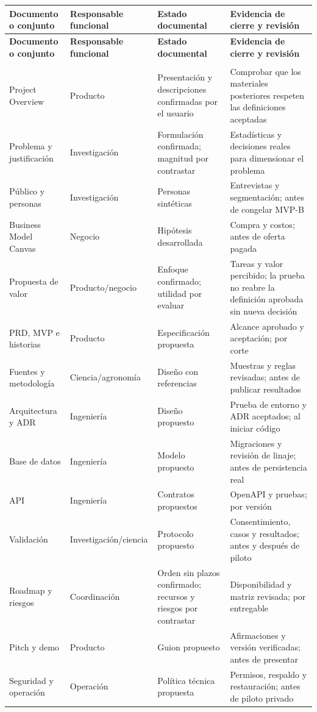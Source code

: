 \documentclass[10pt,a4paper]{article}
\begin{document}
\begingroup\small
\begin{longtable}{>{\raggedright\arraybackslash}p{3.115cm}>{\raggedright\arraybackslash}p{3.582cm}>{\raggedright\arraybackslash}p{4.517cm}>{\raggedright\arraybackslash}p{4.361cm}}
\toprule
\textbf{Documento o conjunto} & \textbf{Responsable funcional} & \textbf{Estado documental} & \textbf{Evidencia de cierre y revisión} \\
\midrule\endfirsthead
\toprule
\textbf{Documento o conjunto} & \textbf{Responsable funcional} & \textbf{Estado documental} & \textbf{Evidencia de cierre y revisión} \\
\midrule\endhead
\midrule\multicolumn{4}{r}{\scriptsize Continúa en la página siguiente}\\\endfoot
\bottomrule\endlastfoot
Project Overview & Producto & Presentación y descripciones confirmadas por el usuario & Comprobar que los materiales posteriores respeten las definiciones aceptadas \\[3pt]
Problema y justificación & Investigación & Formulación confirmada; magnitud por contrastar & Estadísticas y decisiones reales para dimensionar el problema \\[3pt]
Público y personas & Investigación & Personas sintéticas & Entrevistas y segmentación; antes de congelar MVP-B \\[3pt]
Business Model Canvas & Negocio & Hipótesis desarrollada & Compra y costos; antes de oferta pagada \\[3pt]
Propuesta de valor & Producto/\allowbreak{}negocio & Enfoque confirmado; utilidad por evaluar & Tareas y valor percibido; la prueba no reabre la definición aprobada sin nueva decisión \\[3pt]
PRD, MVP e historias & Producto & Especificación propuesta & Alcance aprobado y aceptación; por corte \\[3pt]
Fuentes y metodología & Ciencia/\allowbreak{}agronomía & Diseño con referencias & Muestras y reglas revisadas; antes de publicar resultados \\[3pt]
Arquitectura y ADR & Ingeniería & Diseño propuesto & Prueba de entorno y ADR aceptados; al iniciar código \\[3pt]
Base de datos & Ingeniería & Modelo propuesto & Migraciones y revisión de linaje; antes de persistencia real \\[3pt]
API & Ingeniería & Contratos propuestos & OpenAPI y pruebas; por versión \\[3pt]
Validación & Investigación/\allowbreak{}ciencia & Protocolo propuesto & Consentimiento, casos y resultados; antes y después de piloto \\[3pt]
Roadmap y riesgos & Coordinación & Orden sin plazos confirmado; recursos y riesgos por contrastar & Disponibilidad y matriz revisada; por entregable \\[3pt]
Pitch y demo & Producto & Guion propuesto & Afirmaciones y versión verificadas; antes de presentar \\[3pt]
Seguridad y operación & Operación & Política técnica propuesta & Permisos, respaldo y restauración; antes de piloto privado \\[3pt]
\end{longtable}
\endgroup
\end{document}
